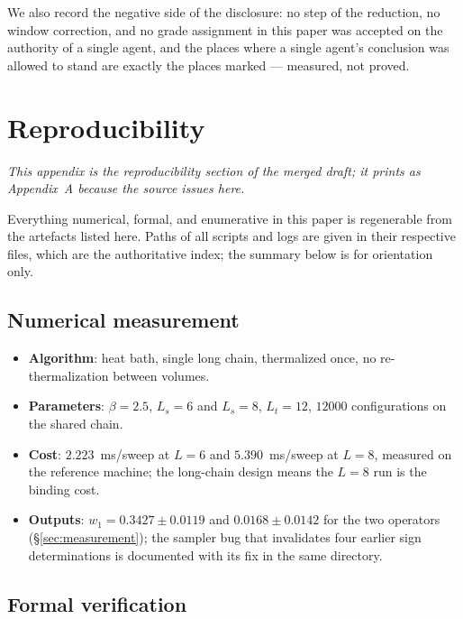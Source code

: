 \noindent We also record the negative side of the disclosure: no step of the reduction, no window
correction, and no grade assignment in this paper was accepted on the authority of a single agent,
and the places where a single agent's conclusion was allowed to stand are exactly the places marked
\LE{} --- measured, not proved.

\appendix

\section{Reproducibility}
\label{sec:appendix-repro}

\noindent\emph{This appendix is the reproducibility section of the merged draft; it prints as
Appendix~A because the source issues  here.}

Everything numerical, formal, and enumerative in this paper is regenerable from the artefacts
listed here. Paths of all scripts and logs are given in their respective  files, which
are the authoritative index; the summary below is for orientation only.

\subsection*{Numerical measurement}

\begin{itemize}
\item \textbf{Algorithm}:  heat bath, single long chain, thermalized once, no
re-thermalization between volumes.
\item \textbf{Parameters}: $\beta = 2.5$, $L_s = 6$ and $L_s = 8$, $L_t = 12$, $12000$
configurations on the shared chain.
\item \textbf{Cost}: $2.223$~ms/sweep at $L = 6$ and $5.390$~ms/sweep at $L = 8$, measured on the
reference machine; the long-chain design means the $L = 8$ run is the binding cost.
\item \textbf{Outputs}: $w_1 = 0.3427 \pm 0.0119$ and $0.0168 \pm 0.0142$ for the two operators
(\S\ref{sec:measurement}); the sampler bug that invalidates four earlier sign determinations is documented with its
fix in the same directory.
\end{itemize}

\subsection*{Formal verification}

